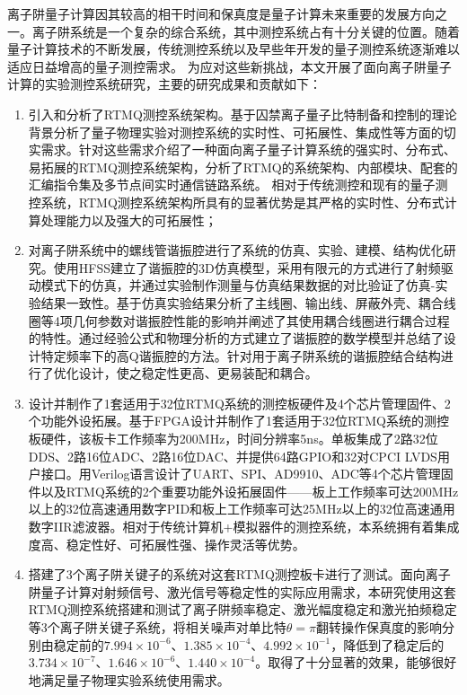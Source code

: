 
\begin{conclusion}

离子阱量子计算因其较高的相干时间和保真度是量子计算未来重要的发展方向之一。离子阱系统是一个复杂的综合系统，其中测控系统占有十分关键的位置。随着量子计算技术的不断发展，传统测控系统以及早些年开发的量子测控系统逐渐难以适应日益增高的量子测控需求。
为应对这些新挑战，本文开展了面向离子阱量子计算的实验测控系统研究，主要的研究成果和贡献如下：
\begin{enumerate}
    \item 引入和分析了RTMQ测控系统架构。基于囚禁离子量子比特制备和控制的理论背景分析了量子物理实验对测控系统的实时性、可拓展性、集成性等方面的切实需求。针对这些需求介绍了一种面向离子量子计算系统的强实时、分布式、易拓展的RTMQ测控系统架构，分析了RTMQ的系统架构、内部模块、配套的汇编指令集及多节点间实时通信链路系统。
    相对于传统测控和现有的量子测控系统，RTMQ测控系统架构所具有的显著优势是其严格的实时性、分布式计算处理能力以及强大的可拓展性；
    \item 对离子阱系统中的螺线管谐振腔进行了系统的仿真、实验、建模、结构优化研究。使用HFSS建立了谐振腔的3D仿真模型，采用有限元的方式进行了射频驱动模式下的仿真，并通过实验制作测量与仿真结果数据的对比验证了仿真-实验结果一致性。基于仿真实验结果分析了主线圈、输出线、屏蔽外壳、耦合线圈等4项几何参数对谐振腔性能的影响并阐述了其使用耦合线圈进行耦合过程的特性。通过经验公式和物理分析的方式建立了谐振腔的数学模型并总结了设计特定频率下的高Q谐振腔的方法。针对用于离子阱系统的谐振腔结合结构进行了优化设计，使之稳定性更高、更易装配和耦合。
    \item 设计并制作了1套适用于32位RTMQ系统的测控板硬件及4个芯片管理固件、2个功能外设拓展。基于FPGA设计并制作了1套适用于32位RTMQ系统的测控板硬件，该板卡工作频率为200MHz，时间分辨率5ns。单板集成了2路32位DDS、2路16位ADC、2路16位DAC、并提供64路GPIO和32对CPCI LVDS用户接口。用Verilog语言设计了UART、SPI、AD9910、ADC等4个芯片管理固件以及RTMQ系统的2个重要功能外设拓展固件——板上工作频率可达200MHz以上的32位高速通用数字PID和板上工作频率可达25MHz以上的32位高速通用数字IIR滤波器。相对于传统计算机+模拟器件的测控系统，本系统拥有着集成度高、稳定性好、可拓展性强、操作灵活等优势。
    \item 搭建了3个离子阱关键子的系统对这套RTMQ测控板卡进行了测试。面向离子阱量子计算对射频信号、激光信号等稳定性的实际应用需求，本研究使用这套RTMQ测控系统搭建和测试了离子阱频率稳定、激光幅度稳定和激光拍频稳定等3个离子阱关键子系统，将相关噪声对单比特$\theta=\pi$翻转操作保真度的影响分别由稳定前的$7.994\times10^{-6}$、$1.385\times 10^{-4}$、$4.992\times 10^{-1}$，降低到了稳定后的$3.734\times10^{-7}$、$1.646\times 10^{-6}$、$1.440\times 10^{-4}$。取得了十分显著的效果，能够很好地满足量子物理实验系统使用需求。
  \end{enumerate}


\end{conclusion}
